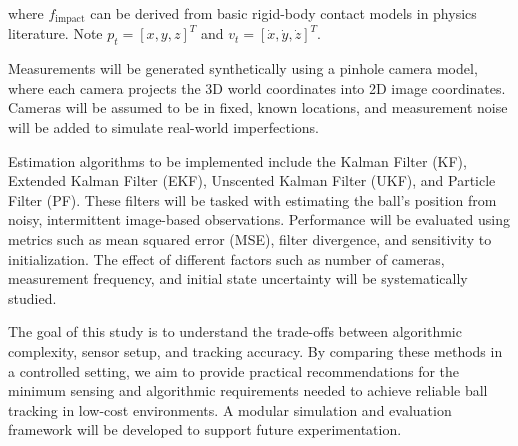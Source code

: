 \documentclass[conference]{IEEEtran}
\begin{document}
where $f_{\text{impact}}$ can be derived from basic rigid-body contact models in physics literature. Note $p_t = [x, y, z]^T$ and $v_t = [\dot{x}, \dot{y}, \dot{z}]^T$.

Measurements will be generated synthetically using a pinhole camera model, where each camera projects the 3D world coordinates into 2D image coordinates. Cameras will be assumed to be in fixed, known locations, and measurement noise will be added to simulate real-world imperfections.

Estimation algorithms to be implemented include the Kalman Filter (KF), Extended Kalman Filter (EKF), Unscented Kalman Filter (UKF), and Particle Filter (PF). These filters will be tasked with estimating the ball's position from noisy, intermittent image-based observations. Performance will be evaluated using metrics such as mean squared error (MSE), filter divergence, and sensitivity to initialization. The effect of different factors such as number of cameras, measurement frequency, and initial state uncertainty will be systematically studied.

The goal of this study is to understand the trade-offs between algorithmic complexity, sensor setup, and tracking accuracy. By comparing these methods in a controlled setting, we aim to provide practical recommendations for the minimum sensing and algorithmic requirements needed to achieve reliable ball tracking in low-cost environments. A modular simulation and evaluation framework will be developed to support future experimentation.


 
\end{document}
